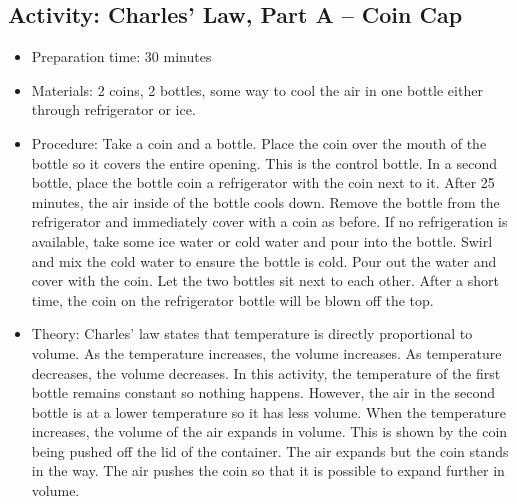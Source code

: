 \begin{itemize}
{\begin{itemize}
\begin{itemize}
{\subsection{Activity: Charles’ Law, Part A – Coin Cap}
\begin{itemize}
\item{Preparation time: 30 minutes}
\item{Materials: 2 coins, 2 bottles, some way to cool the air in one bottle either through refrigerator or ice.}
\item{Procedure: Take a coin and a bottle. Place the coin over the mouth of the bottle so it covers the entire opening. This is the control bottle. In a second bottle, place the bottle coin a refrigerator with the coin next to it. After 25 minutes, the air inside of the bottle cools down. Remove the bottle from the refrigerator and immediately cover with a coin as before. If no refrigeration is available, take some ice water or cold water and pour into the bottle. Swirl and mix the cold water to ensure the bottle is cold. Pour out the water and cover with the coin. Let the two bottles sit next to each other. After a short time, the coin on the refrigerator bottle will be blown off the top. }
\item{Theory: Charles’ law states that temperature is directly proportional to volume. As the temperature increases, the volume increases. As temperature decreases, the volume decreases. In this activity, the temperature of the first bottle remains constant so nothing happens. However, the air in the second bottle is at a lower temperature so it has less volume. When the temperature increases, the volume of the air expands in volume. This is shown by the coin being pushed off the lid of the container. The air expands but the coin stands in the way. The air pushes the coin so that it is possible to expand further in volume.}
\end{itemize}

}
\end{itemize}
\end{itemize}}
\end{itemize}
